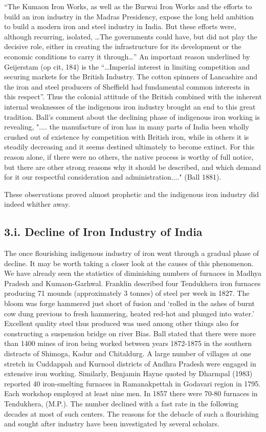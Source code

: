 “The Kumaon Iron Works, as well as the Burwai Iron Works and the efforts to build an iron industry in the Madras Presidency, expose the long held ambition to build a modern iron and steel industry in India. But these efforts were, although recurring, isolated, …The governments could have, but did not play the decisive role, either in creating the infrastructure for its development or the economic conditions to carry it through…” An important reason underlined by Geijerstam (op cit, 184) is the “…Imperial interest in limiting competition and securing markets for the British Industry. The cotton spinners of Lancashire and the iron and steel producers of Sheffield had fundamental common interests in this respect”. Thus the colonial attitude of the British combined with the inherent internal weaknesses of the indigenous iron industry brought an end to this great tradition. Ball's comment about the declining phase of indigenous iron working is revealing, ".... the manufacture of iron has in many parts of India been wholly crushed out of existence by competition with British iron, while in others it is steadily decreasing and it seems destined ultimately to become extinct.  For this reason alone, if there were no others, the native process is worthy of full notice, but there are other strong reasons why it should be described, and which demand for it our respectful consideration and administration...." (Ball 1881).

These observations proved almost prophetic and the indigenous iron industry did indeed whither away. 

\subsection*{3.i.  Decline of Iron Industry of India}

The once flourishing indigenous industry of iron went through a gradual phase of decline. It may be worth taking a closer look at the causes of this phenomenon. We have already seen the statistics of diminishing numbers of furnaces in Madhya Pradesh and Kumaon-Garhwal. Franklin described four Tendukhera iron furnaces producing 71 mounds (approximately 3 tonnes) of steel per week in 1827. The bloom was forge hammered just short of fusion and ‘rolled in the ashes of burnt cow dung previous to fresh hammering, heated red-hot and plunged into water.’ Excellent quality steel thus produced was used among other things also for constructing a suspension bridge on river Bias. Ball stated that there were more than 1400 mines of iron being worked between years 1872-1875 in the southern distracts of Shimoga, Kadur and Chitaldurg. A large number of villages at one stretch in Cuddappah and Kurnool districts of Andhra Pradesh were engaged in extensive iron working. Similarly, Benjamin Hayne quoted by Dharmpal (1983) reported 40 iron-smelting furnaces in Ramanakpettah in Godavari region in 1795. Each workshop employed at least nine men.  In 1857 there were 70-80 furnaces in Tendukhera, (M.P.). The number declined with a fast rate in the following decades at most of such centers. The reasons for the debacle of such a flourishing and sought after industry have been investigated by several scholars.

